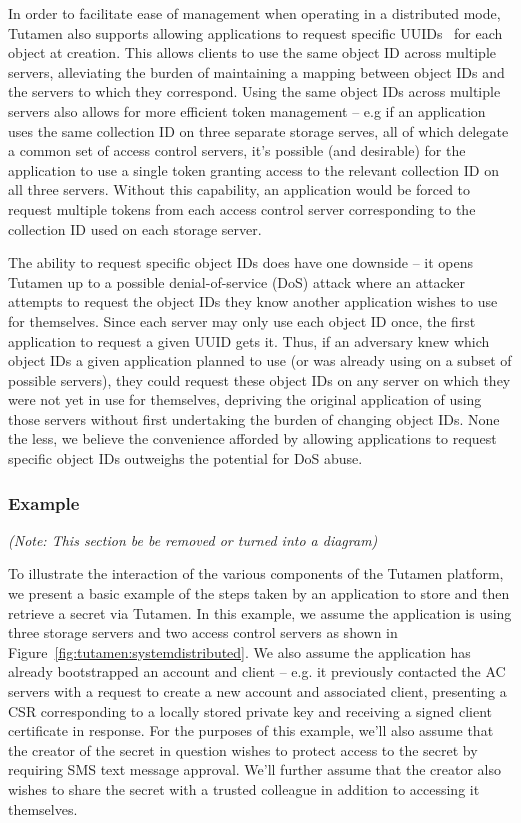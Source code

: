 In order to facilitate ease of management when operating in a
distributed mode, Tutamen also supports allowing applications to
request specific UUIDs~\cite{leach2005} for each object at creation.
This allows clients to use the same object ID across multiple servers,
alleviating the burden of maintaining a mapping between object IDs and
the servers to which they correspond. Using the same object IDs across
multiple servers also allows for more efficient token management --
e.g if an application uses the same collection ID on three separate
storage serves, all of which delegate a common set of access control
servers, it's possible (and desirable) for the application to use a
single token granting access to the relevant collection ID on all
three servers. Without this capability, an application would be forced
to request multiple tokens from each access control server
corresponding to the collection ID used on each storage server.

The ability to request specific object IDs does have one downside --
it opens Tutamen up to a possible denial-of-service (DoS) attack where
an attacker attempts to request the object IDs they know another
application wishes to use for themselves. Since each server may only
use each object ID once, the first application to request a given UUID
gets it. Thus, if an adversary knew which object IDs a given
application planned to use (or was already using on a subset of
possible servers), they could request these object IDs on any server
on which they were not yet in use for themselves, depriving the
original application of using those servers without first undertaking
the burden of changing object IDs. None the less, we believe the
convenience afforded by allowing applications to request specific
object IDs outweighs the potential for DoS abuse.

\subsubsection{Example}

{\em(Note: This section be be removed or turned into a diagram)}

To illustrate the interaction of the various components of the Tutamen
platform, we present a basic example of the steps taken by an
application to store and then retrieve a secret via Tutamen. In this
example, we assume the application is using three storage servers and
two access control servers as shown in
Figure~\ref{fig:tutamen:systemdistributed}. We also assume the
application has already bootstrapped an account and client -- e.g. it
previously contacted the AC servers with a request to create a new
account and associated client, presenting a CSR corresponding to a
locally stored private key and receiving a signed client certificate
in response. For the purposes of this example, we'll also assume that
the creator of the secret in question wishes to protect access to the
secret by requiring SMS text message approval. We'll further assume
that the creator also wishes to share the secret with a trusted
colleague in addition to accessing it themselves.

